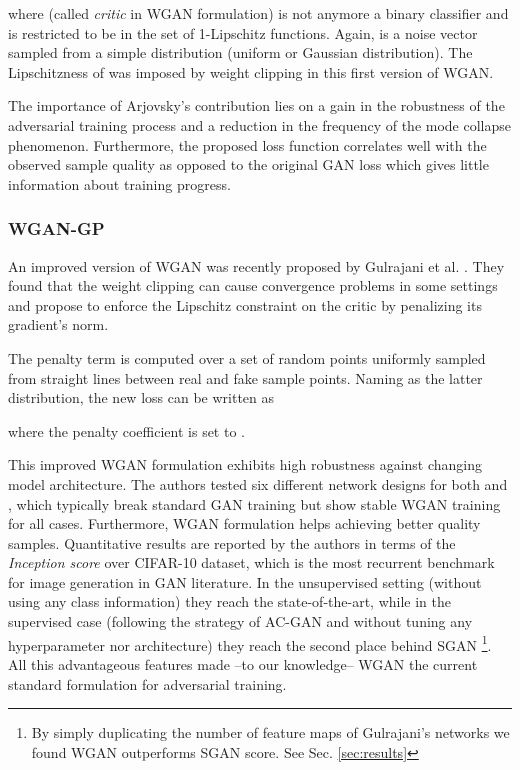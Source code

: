 \documentclass[times,twocolumn]{article}
\begin{document}
where  (called \textit{critic} in WGAN formulation) is not anymore a binary classifier and is restricted to be in the set  of 1-Lipschitz functions. Again,  is a noise vector sampled from a simple distribution (uniform or Gaussian distribution). The Lipschitzness of  was imposed by weight clipping in this first version of WGAN.

The importance of Arjovsky's contribution lies on a gain in the robustness of the adversarial training process and a reduction in the frequency of the mode collapse phenomenon. Furthermore, the proposed loss function correlates well with the observed sample quality as opposed to the original GAN loss which gives little information about training progress.
\subsubsection{WGAN-GP}
An improved version of WGAN was recently proposed by Gulrajani et al. \cite{Gulrajani2017}. They found that the weight clipping can cause convergence problems in some settings and propose to enforce the Lipschitz constraint on the critic  by penalizing its gradient's norm.

The penalty term is computed over a set of random points  uniformly sampled from straight lines between real and fake sample points. Naming as  the latter distribution, the new loss can be written as

where the penalty coefficient is set to .

This improved WGAN formulation exhibits high robustness against changing model architecture. The authors tested six different network designs for both  and , which typically break standard GAN training but show stable WGAN training for all cases. Furthermore, WGAN formulation helps achieving better quality samples. Quantitative results are reported by the authors in terms of the \textit{Inception score} \cite{Salimans2016} over CIFAR-10 dataset, which is the most recurrent benchmark for image generation in GAN literature. In the unsupervised setting (without using any class information) they reach the state-of-the-art, while in the supervised case (following the strategy of AC-GAN and without tuning any hyperparameter nor architecture) they reach the second place behind SGAN \cite{Huang2016}\footnote{By simply duplicating the number of feature maps of Gulrajani's networks we found WGAN outperforms SGAN score. See Sec. \ref{sec:results}}. All this advantageous features made --to our knowledge-- WGAN the current standard formulation for adversarial training.
\end{document}
